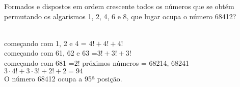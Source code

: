 \begin{ex}
Formados e dispostos em ordem crescente todos os números que se obtém permutando os algarismos 1, 2, 4, 6 e 8, que lugar ocupa o número 68412?
  \begin{sol}
   \phantom{A} \\
   começando com 1, 2 e 4 = $4!+4!+4!$\\
   começando com 61, 62 e 63 =$3!+3!+3!$ \\
   começando com 681 =$2!$
   próximos números = 68214, 68241 \\
   $3\cdot4!+3\cdot3!+2!+2= 94$\\
   O número 68412 ocupa a 95ª posição.
  \end{sol}
\end{ex}